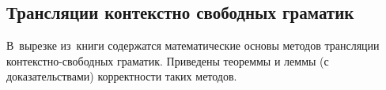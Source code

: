 \subsection{Трансляции контекстно свободных граматик} \label{subsection_Aho1971}
В~вырезке из~книги \cite{Aho1971} содержатся математические основы методов трансляции контекстно-свободных граматик. Приведены теореммы и леммы (с доказательствами) корректности таких методов.

